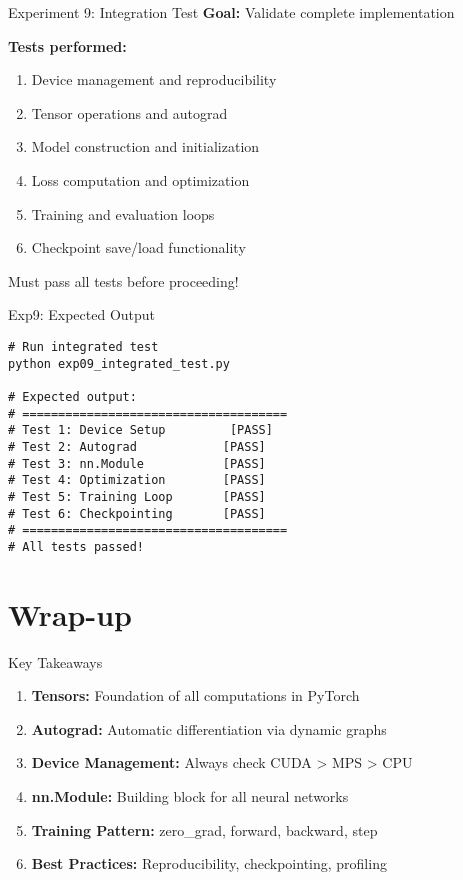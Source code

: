 \documentclass[aspectratio=169,10pt]{beamer}
\begin{document}
\begin{frame}{Experiment 9: Integration Test}
\textbf{Goal:} Validate complete implementation

\textbf{Tests performed:}
\begin{enumerate}
    \item Device management and reproducibility
    \item Tensor operations and autograd
    \item Model construction and initialization
    \item Loss computation and optimization
    \item Training and evaluation loops
    \item Checkpoint save/load functionality
\end{enumerate}

Must pass all tests before proceeding!
\end{frame}

\begin{frame}[fragile]{Exp9: Expected Output}
\begin{lstlisting}
# Run integrated test
python exp09_integrated_test.py

# Expected output:
# =====================================
# Test 1: Device Setup         [PASS]
# Test 2: Autograd            [PASS]
# Test 3: nn.Module           [PASS]
# Test 4: Optimization        [PASS]
# Test 5: Training Loop       [PASS]
# Test 6: Checkpointing       [PASS]
# =====================================
# All tests passed!
\end{lstlisting}
\end{frame}

\section{Wrap-up}

\begin{frame}{Key Takeaways}
\begin{enumerate}
    \item \textbf{Tensors:} Foundation of all computations in PyTorch
    \item \textbf{Autograd:} Automatic differentiation via dynamic graphs
    \item \textbf{Device Management:} Always check CUDA > MPS > CPU
    \item \textbf{nn.Module:} Building block for all neural networks
    \item \textbf{Training Pattern:} zero\_grad, forward, backward, step
    \item \textbf{Best Practices:} Reproducibility, checkpointing, profiling
\end{enumerate}
\end{frame}
\end{document}
